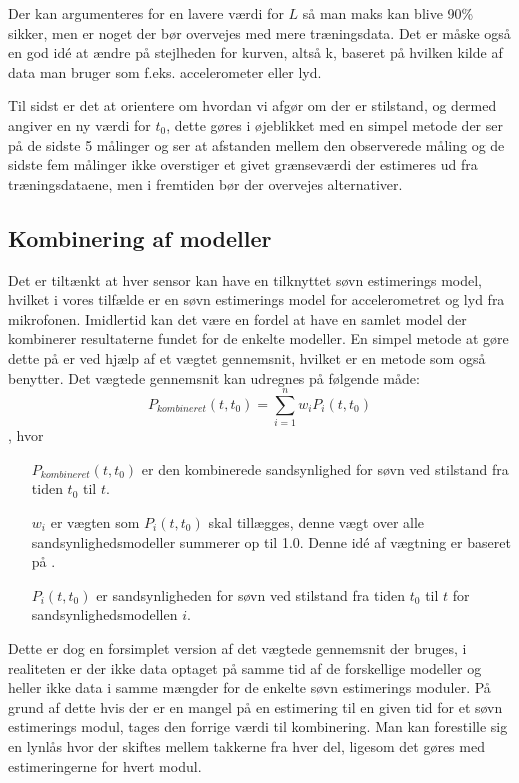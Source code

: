 Der kan argumenteres for en lavere værdi for $L$ så man maks kan blive 90\% sikker, men er noget der bør overvejes med mere træningsdata. Det er måske også en god idé at ændre på stejlheden for kurven, altså k, baseret på hvilken kilde af data man bruger som f.eks. accelerometer eller lyd.

Til sidst er det at orientere om hvordan vi afgør om der er stilstand, og dermed angiver en ny værdi for $t_0$, dette gøres i øjeblikket med en simpel metode der ser på de sidste 5 målinger og ser at afstanden mellem den observerede måling og de sidste fem målinger ikke overstiger et givet grænseværdi der estimeres ud fra træningsdataene, men i fremtiden bør der overvejes alternativer.

\subsection{Kombinering af modeller}\label{subsec:kombimodeller}
Det er tiltænkt at hver sensor kan have en tilknyttet søvn estimerings model, hvilket i vores tilfælde er en søvn estimerings model for accelerometret og lyd fra mikrofonen.
Imidlertid kan det være en fordel at have en samlet model der kombinerer resultaterne fundet for de enkelte modeller.
En simpel metode at gøre dette på er ved hjælp af et vægtet gennemsnit, hvilket er en metode som \citet{6563918} også benytter.
Det vægtede gennemsnit kan udregnes på følgende måde:
\begin{equation}
	P_{kombineret}(t,t_0) = \sum_{i=1}^{n}{w_iP_i(t,t_0)}
\end{equation}
, hvor
\begin{itemize}
	\item[$P_{kombineret}(t,t_0)$] er den kombinerede sandsynlighed for søvn ved stilstand fra tiden $t_0$ til $t$.
	\item[$w_i$] er vægten som $P_i(t,t_0)$ skal tillægges, denne vægt over alle sandsynlighedsmodeller summerer op til 1.0. Denne idé af vægtning er baseret på \citet{6563918}.
	\item[$P_i(t,t_0)$] er sandsynligheden for søvn ved stilstand fra tiden $t_0$ til $t$ for sandsynlighedsmodellen $i$.
\end{itemize}

Dette er dog en forsimplet version af det vægtede gennemsnit der bruges, i realiteten er der ikke data optaget på samme tid af de forskellige modeller og heller ikke data i samme mængder for de enkelte søvn estimerings moduler.
På grund af dette hvis der er en mangel på en estimering til en given tid for et søvn estimerings modul, tages den forrige værdi til kombinering.
Man kan forestille sig en lynlås hvor der skiftes mellem takkerne fra hver del, ligesom det gøres med estimeringerne for hvert modul.

